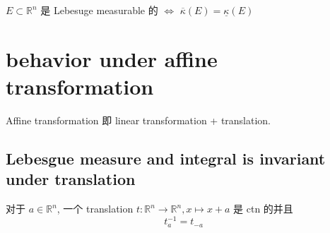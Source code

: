 \documentclass[lang=cn,11pt]{elegantbook}
\begin{document}
\begin{corollary}
$E \subset \mathbb{R}^n$ 是 Lebesuge measurable 的 $\Longleftrightarrow$ $\overline{\kappa}(E) = \underline{\kappa}(E)$
\end{corollary}



\section{behavior under affine transformation}
Affine transformation 即 linear transformation + translation.
\subsection{Lebesgue measure and integral is invariant under translation}
对于 $a \in \mathbb{R}^n$, 一个 translation $t: \mathbb{R}^n \to \mathbb{R}^n, x \mapsto x+ a$ 是 ctn 的并且 \[
t_a^{-1} = t_{-a}
\]
\end{document}

